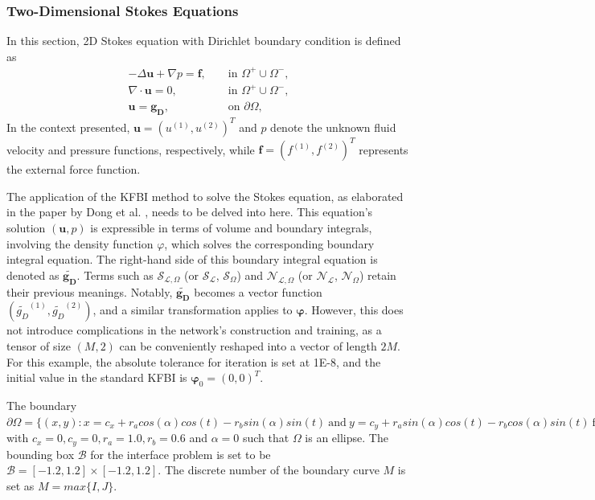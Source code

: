 \documentclass{article}
\begin{document}
\subsubsection{Two-Dimensional Stokes Equations}
In this section, 2D Stokes equation with Dirichlet boundary condition is defined as
\begin{equation} \label{eq4.1.3.1}
\begin{array}{rll}
-\Delta \mathbf{u}+\nabla p =\mathbf{f}, & & \text { in } \Omega^{+} \cup \Omega^{-}, \\
\nabla \cdot \mathbf{u}=0, & & \text { in } \Omega^{+} \cup \Omega^{-}, \\
\mathbf{u}=\mathbf{g_D}, & & \text { on } \partial \Omega,
\end{array}
\end{equation}
In the context presented, $\mathbf{u}=\left(u^{(1)}, u^{(2)}\right)^T$ and $p$ denote the unknown fluid velocity and pressure functions, respectively, while $\mathbf{f}=\left(f^{(1)}, f^{(2)}\right)^T$ represents the external force function.

The application of the KFBI method to solve the Stokes equation, as elaborated in the paper by Dong et al. \cite {dong2023second}, needs to be delved into here. This equation's solution $(\mathbf{u}, p)$ is expressible in terms of volume and boundary integrals, involving the density function $\varphi$, which solves the corresponding boundary integral equation. The right-hand side of this boundary integral equation is denoted as \(\widetilde{\mathbf{g_D}}\). Terms such as $\mathcal{S}_{\mathcal{L}, \Omega}$ (or $\mathcal{S}_{\mathcal{L}}$, $\mathcal{S}_{\Omega}$) and $\mathcal{N}_{\mathcal{L}, \Omega}$ (or $\mathcal{N}_{\mathcal{L}}$, $\mathcal{N}_{\Omega}$) retain their previous meanings. Notably, $\widetilde{\mathbf{g_D}}$ becomes a vector function \((\widetilde{g_D}^{(1)},\widetilde{g_D}^{(2)})\), and a similar transformation applies to \(\mathbf{\varphi}\). However, this does not introduce complications in the network's construction and training, as a tensor of size $(M, 2)$ can be conveniently reshaped into a vector of length $2M$. For this example, the absolute tolerance for iteration is set at 1E-8, and the initial value in the standard KFBI is $\mathbf{\varphi}_0 = (0, 0)^T$.

The boundary $\partial \Omega = \{(x, y): x = c_x + r_a cos(\alpha) cos(t) - r_b sin(\alpha) sin(t)\ \mbox{and}\ y = c_y + r_a sin(\alpha) cos(t) - r_b cos(\alpha) sin(t)\ \mbox{for}\ t \in [0, 2\pi) \}$ with $c_x = 0, c_y = 0, r_a = 1.0, r_b = 0.6$ and $\alpha = 0$ such that $\Omega$ is an ellipse. The bounding box $\mathcal{B}$ for the interface problem is set to be $\mathcal{B} = [-1.2,1.2] \times [-1.2,1.2]$. The discrete number of the boundary curve $M$ is set as $M = max\{I, J\}$.
\end{document}
